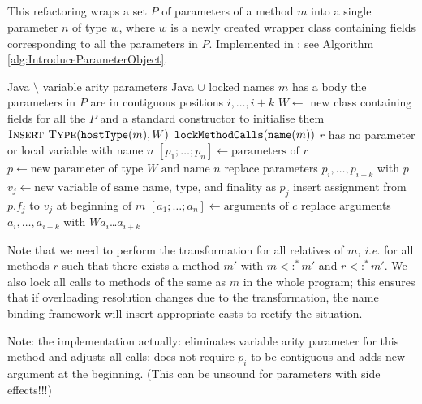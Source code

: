 \subsection{}
This refactoring wraps a set $P$ of parameters of a method $m$ into a single parameter $n$ of type $w$, where $w$ is a newly created wrapper class containing fields corresponding to all the parameters in $P$. Implemented in ; see Algorithm \ref{alg:IntroduceParameterObject}.

\begin{algorithm}[p]
\caption{$\refactoring{Introduce Parameter Object}(m : \type{Method}, P : \settp{\type{Parameter}}, w : \settp{Name}, n : \settp{Name})$}
\label{alg:IntroduceParameterObject}
\begin{algorithmic}[1]
\REQUIRE Java $\setminus$ variable arity parameters
\ENSURE Java $\cup$ locked names
\medskip
\STATE \assert $m$ has a body
\STATE \assert the parameters in $P$ are in contiguous positions $i, \ldots, i+k$
\STATE $W \leftarrow$ new class containing fields for all the $P$ and a standard constructor to initialise them
\STATE $\textsc{Insert Type}(\text{\texttt{hostType}}(m), W)$
\STATE $\text{\texttt{lockMethodCalls}}(\text{\texttt{name}}(m))$
  \STATE \assert $r$ has no parameter or local variable with name $n$
  \STATE $[p_1;\ldots;p_n] \leftarrow \text{parameters of $r$}$
  \STATE $p \leftarrow \text{new parameter of type $W$ and name $n$}$
  \STATE replace parameters $p_i, \ldots, p_{i+k}$ with $p$
    \STATE $v_j \leftarrow \text{new variable of same name, type, and finality as $p_j$}$
    \STATE insert assignment from $p.f_j$ to $v_j$ at beginning of $m$
  \ENDFOR
    \STATE $[a_1;\ldots;a_n] \leftarrow \text{arguments of $c$}$
    \STATE replace arguments $a_i, \ldots, a_{i+k}$ with $W$\code{(}$a_i$\code{,}\ldots\code{,}$a_{i+k}$\code{)}
  \ENDFOR
\ENDFOR
\end{algorithmic}
\end{algorithm}

Note that we need to perform the transformation for all relatives of $m$, \emph{i.e.} for all methods $r$ such that there exists a method $m'$ with $m<:^*m'$ and $r<:^*m'$. We also lock all calls to methods of the same as $m$ in the whole program; this ensures that if overloading resolution changes due to the transformation, the name binding framework will insert appropriate casts to rectify the situation.

Note: the implementation actually: eliminates variable arity parameter for this method and adjusts all calls; does not require $p_i$ to be contiguous and adds new argument at the beginning. (This can be unsound for parameters with side effects!!!)
